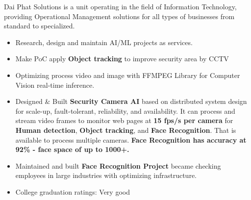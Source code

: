 \documentclass[10pt,a4paper,ragged2e,withhyper]{altacv}
\begin{document}
\begin{paracol}{2}
\begin{minipage}{\linewidth}
\justifying
    Dai Phat Solutions is a unit operating in the field of Information Technology, providing Operational Management solutions for all types of businesses from standard to specialized.
\end{minipage}
\medskip
\begin{itemize}
	\item Research, design and maintain AI/ML projects as services.
	\item Make PoC apply \textbf{Object tracking} to improve security area by CCTV
	\item Optimizing process video and image with FFMPEG Library for Computer Vision real-time inference.
	\item Designed \& Built \textbf{Security Camera AI} based on distributed system design for scale-up, fault-tolerant, reliability, and availability. It can process and stream video frames to monitor web pages at \textbf{15 fps/s per camera} for \textbf{Human detection}, \textbf{Object tracking}, and \textbf{Face Recognition}. That is available to process multiple cameras. \textbf{Face Recognition has accuracy at 92\% - face space of up to 1000+.}
	\item Maintained and built \textbf{Face Recognition Project} became checking employees in large industries with optimizing infrastructure.
\end{itemize}

\smallskip

\divider

\medskip 

\switchcolumn

\begin{itemize}
	\item College graduation ratings: Very good
\end{itemize}
\smallskip


\divider

\divider


\end{paracol}
\end{document}
